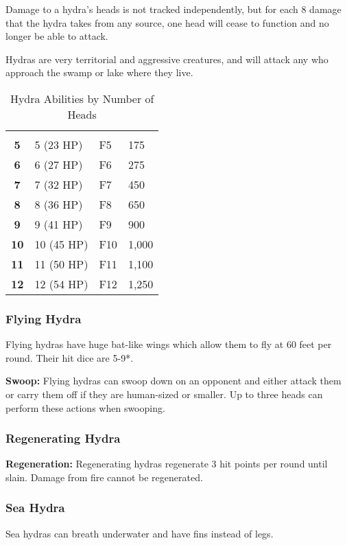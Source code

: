 \begin{multicols*}{2}
Damage to a hydra’s heads is not tracked independently, but for each 8 damage that the hydra takes from any source, one head will cease to function and no longer be able to attack.

Hydras are very territorial and aggressive creatures, and will attack any who approach the swamp or lake where they live.

\begin {table}[H]
  \caption{Hydra Abilities by Number of Heads}\label{tab:Hydra Abilities by Number of Heads}
  \begin{tabularx}{\columnwidth}{>{\bfseries}cYYY}
	 &  &  & \\
	5 & 5 (23 HP) & F5 & 175\\
	6 & 6 (27 HP) & F6 & 275\\
	7 & 7 (32 HP) & F7 & 450\\
	8 & 8 (36 HP) & F8 & 650\\
	9 & 9 (41 HP) & F9 & 900\\
	10 & 10 (45 HP) & F10 & 1,000\\
	11 & 11 (50 HP) & F11 & 1,100\\
	12 & 12 (54 HP) & F12 & 1,250
  \end {tabularx}
\end {table}

\subsubsection{Flying Hydra}
Flying hydras have huge bat-like wings which allow them to fly at 60 feet per round. Their hit dice are 5-9*.

\textbf{Swoop:} Flying hydras can swoop down on an opponent and either attack them or carry them off if they are human-sized or smaller. Up to three heads can perform these actions when swooping.

\subsubsection{Regenerating Hydra}
\textbf{Regeneration:} Regenerating hydras regenerate 3 hit points per round until slain. Damage from fire cannot be regenerated.

\subsubsection{Sea Hydra}
Sea hydras can breath underwater and have fins instead of legs.


\end{multicols*}
